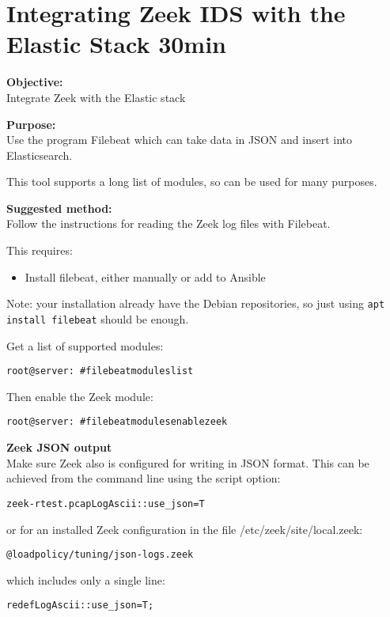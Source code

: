 \documentclass[a4paper,11pt,notitlepage]{report}
\begin{document}
\chapter{Integrating Zeek IDS with the Elastic Stack 30min}
\label{ex:zeek-to-elastic}

{\bf Objective:}\\
Integrate Zeek with the Elastic stack

{\bf Purpose:}\\
Use the program Filebeat which can take data in JSON and insert into Elasticsearch.

This tool supports a long list of modules, so can be used for many purposes.

{\bf Suggested method:}\\
Follow the instructions for reading the Zeek log files with Filebeat.

This requires:
\begin{itemize}
\item Install filebeat, either manually or add to Ansible
\end{itemize}

Note: your installation already have the Debian repositories, so just using \verb+apt install filebeat+ should be enough.

Get a list of supported modules:
\begin{alltt}
root@server:~# filebeat modules list
\end{alltt}

Then enable the Zeek module:
\begin{alltt}
root@server:~# filebeat modules enable zeek
\end{alltt}

{\bf Zeek JSON output}\\
Make sure Zeek also is configured for writing in JSON format. This can be achieved from the command line using the script option:
\begin{alltt}
zeek -r test.pcap LogAscii::use_json=T
\end{alltt}

or for an installed Zeek configuration in the file /etc/zeek/site/local.zeek:
\begin{alltt}
@load policy/tuning/json-logs.zeek
\end{alltt}

which includes only a single line:
\begin{alltt}
redef LogAscii::use_json=T;
\end{alltt}
\end{document}
